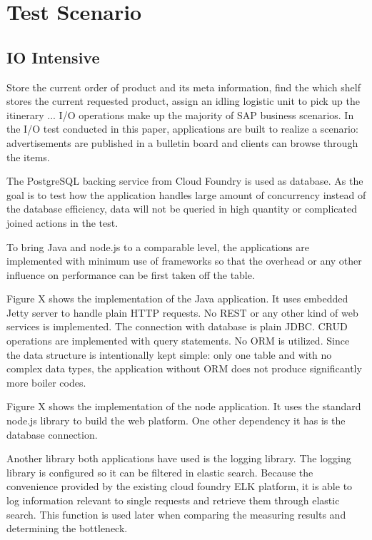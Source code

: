 \chapter{Test Scenario}
\section{IO Intensive}
Store the current order of product and its meta information, find the which shelf stores the current requested product, assign an idling logistic unit to pick up the itinerary ... I/O operations make up the majority of SAP business scenarios.    
 In the I/O test conducted in this paper, applications are built to realize a scenario: advertisements are published in a bulletin board and clients can browse through the items. 

The PostgreSQL backing service from Cloud Foundry is used as database. As the goal is to test how the application handles large amount of concurrency instead of the database efficiency, data will not be queried in high quantity or complicated joined actions  in the test. 

To bring Java and node.js to a comparable level, the applications are implemented with minimum use of frameworks so that the overhead or any other influence on performance can be first taken off the table. 

Figure X shows the implementation of the Java application. It uses embedded Jetty server to handle plain HTTP requests. No REST or any other kind of web services is implemented. The connection with database is plain JDBC. CRUD operations are implemented with query statements. No ORM is utilized. Since the data structure is intentionally kept simple: only one table and with no complex data types, the application without ORM does not produce significantly more boiler codes.
 
Figure X shows the implementation of the node application. It uses the standard node.js library to build the web platform. One other dependency it has is the database connection. 

Another library both applications have used is the logging library. The logging library is configured so it can be filtered in elastic search. Because the convenience provided by the existing cloud foundry ELK platform, it is able to log information relevant to single requests and retrieve them through elastic search. This function is used later when comparing the measuring results and determining the bottleneck. 
     

